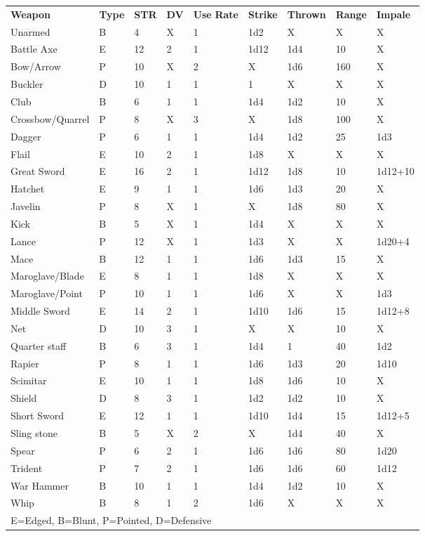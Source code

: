 \begin{normboxc}
\small
\begin{tabular}{@{}l l l l l l l l l}
\textbf{Weapon} & \textbf{Type} & \textbf{STR} & \textbf{DV} & \textbf{Use} \textbf{Rate} & \textbf{Strike} & \textbf{Thrown} & \textbf{Range} & \textbf{Impale}\\
Unarmed & B & 4 & X & 1 & 1d2 & X & X & X\\
Battle Axe & E & 12 & 2 & 1 & 1d12 & 1d4 & 10 & X\\
Bow/Arrow & P & 10 & X & 2 & X & 1d6 & 160 & X\\
Buckler & D & 10 & 1 & 1 & 1 & X & X & X\\
Club & B & 6 & 1 & 1 & 1d4 & 1d2 & 10 & X\\
Crossbow/Quarrel & P & 8 & X & 3 & X & 1d8 & 100 & X\\
Dagger & P & 6 & 1 & 1 & 1d4 & 1d2 & 25 & 1d3\\
Flail & E & 10 & 2 & 1 & 1d8 & X & X & X\\
Great Sword & E & 16 & 2 & 1 & 1d12 & 1d8 & 10 & 1d12+10\\
Hatchet & E & 9 & 1 & 1 & 1d6 & 1d3 & 20 & X\\
Javelin & P & 8 & X & 1 & X & 1d8 & 80 & X\\
Kick & B & 5 & X & 1 & 1d4 & X & X & X\\
Lance & P & 12 & X & 1 & 1d3 & X & X & 1d20+4\\
Mace & B & 12 & 1 & 1 & 1d6 & 1d3 & 15 & X\\
Maroglave/Blade & E & 8 & 1 & 1 & 1d8 & X & X & X\\
Maroglave/Point & P & 10 & 1 & 1 & 1d6 & X & X & 1d3\\
Middle Sword & E & 14 & 2 & 1 & 1d10 & 1d6 & 15 & 1d12+8\\
Net & D & 10 & 3 & 1 & X & X & 10 & X\\
Quarter staff & B & 6 & 3 & 1 & 1d4 & 1 & 40 & 1d2\\
Rapier & P & 8 & 1 & 1 & 1d6 & 1d3 & 20 & 1d10\\
Scimitar & E & 10 & 1 & 1 & 1d8 & 1d6 & 10 & X\\
Shield & D & 8 & 3 & 1 & 1d2 & 1d2 & 10 & X\\
Short Sword & E & 12 & 1 & 1 & 1d10 & 1d4 & 15 & 1d12+5\\
Sling stone & B & 5 & X & 2 & X & 1d4 & 40 & X\\
Spear & P & 6 & 2 & 1 & 1d6 & 1d6 & 80 & 1d20\\
Trident & P & 7 & 2 & 1 & 1d6 & 1d6 & 60 & 1d12\\
War Hammer & B & 10 & 1 & 1 & 1d4 & 1d2 & 10 & X\\
Whip & B & 8 & 1 & 2 & 1d6 & X & X & X\\
\multicolumn{9}{l}{E=Edged, B=Blunt, P=Pointed, D=Defensive}
\end{tabular}
\end{normboxc}
